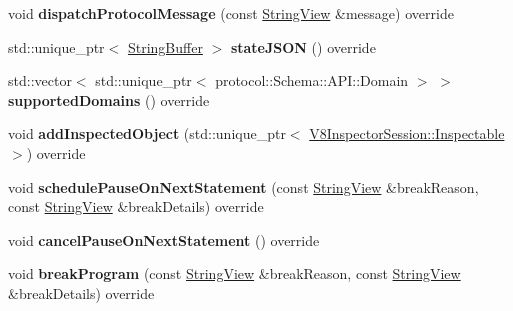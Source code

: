 \begin{DoxyCompactItemize}
void {\bfseries dispatch\+Protocol\+Message} (const \mbox{\hyperlink{classv8__inspector_1_1StringView}{String\+View}} \&message) override
\item 
\mbox{\label{classv8__inspector_1_1V8InspectorSessionImpl_aa3afac5642269ddc124c2e26d409d49f}} 
std\+::unique\+\_\+ptr$<$ \mbox{\hyperlink{classv8__inspector_1_1StringBuffer}{String\+Buffer}} $>$ {\bfseries state\+J\+S\+ON} () override
\item 
\mbox{\label{classv8__inspector_1_1V8InspectorSessionImpl_a4a1c6a593752f8aa5202b75886cc5d48}} 
std\+::vector$<$ std\+::unique\+\_\+ptr$<$ protocol\+::\+Schema\+::\+A\+P\+I\+::\+Domain $>$ $>$ {\bfseries supported\+Domains} () override
\item 
\mbox{\label{classv8__inspector_1_1V8InspectorSessionImpl_a4bfdec07dd9669cec68782a22f5013b8}} 
void {\bfseries add\+Inspected\+Object} (std\+::unique\+\_\+ptr$<$ \mbox{\hyperlink{classv8__inspector_1_1V8InspectorSession_1_1Inspectable}{V8\+Inspector\+Session\+::\+Inspectable}} $>$) override
\item 
\mbox{\label{classv8__inspector_1_1V8InspectorSessionImpl_a5d4d9e39fbf247b75951858e7f3499d6}} 
void {\bfseries schedule\+Pause\+On\+Next\+Statement} (const \mbox{\hyperlink{classv8__inspector_1_1StringView}{String\+View}} \&break\+Reason, const \mbox{\hyperlink{classv8__inspector_1_1StringView}{String\+View}} \&break\+Details) override
\item 
\mbox{\label{classv8__inspector_1_1V8InspectorSessionImpl_ae410b69f998f54888911b1ec587295ea}} 
void {\bfseries cancel\+Pause\+On\+Next\+Statement} () override
\item 
\mbox{\label{classv8__inspector_1_1V8InspectorSessionImpl_a2e8787b380116f3ea19da88c02396bd7}} 
void {\bfseries break\+Program} (const \mbox{\hyperlink{classv8__inspector_1_1StringView}{String\+View}} \&break\+Reason, const \mbox{\hyperlink{classv8__inspector_1_1StringView}{String\+View}} \&break\+Details) override
\item 
\mbox{\label{classv8__inspector_1_1V8InspectorSessionImpl_aedfb3f30c1a62404bd7008b5d47f251c}} 

\end{DoxyCompactItemize}
